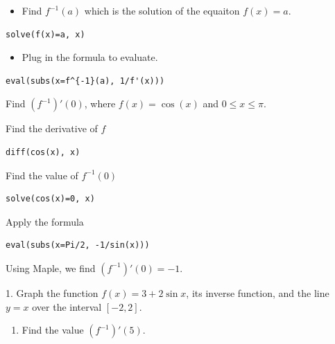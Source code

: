 \documentclass[en,11pt,simple]{elegantbook}
\let\BeginKnitrBlock\begin \let\EndKnitrBlock\end
\begin{document}
\begin{itemize}

\item
  Find \(f^{-1}(a)\) which is the solution of the equaiton \(f(x)=a\).
\end{itemize}

\begin{verbatim}
solve(f(x)=a, x)
\end{verbatim}

\begin{itemize}

\item
  Plug in the formula to evaluate.
\end{itemize}

\begin{verbatim}
eval(subs(x=f^{-1}(a), 1/f'(x)))
\end{verbatim}

\BeginKnitrBlock{example}{}{}
\protect\hypertarget{exm:unnamed-chunk-166}{}{\label{exm:unnamed-chunk-166} }
Find \((f^{-1})'(0)\), where \(f(x)=\cos(x)\) and \(0\leq x\leq \pi\).
\EndKnitrBlock{example}

\BeginKnitrBlock{solution}{}{}
{}
Find the derivative of \(f\)

\begin{verbatim}
diff(cos(x), x)
\end{verbatim}

Find the value of \(f^{-1}(0)\)

\begin{verbatim}
solve(cos(x)=0, x)
\end{verbatim}

Apply the formula

\begin{verbatim}
eval(subs(x=Pi/2, -1/sin(x)))
\end{verbatim}

Using Maple, we find \((f^{-1})'(0)=-1\).
\EndKnitrBlock{solution}

\BeginKnitrBlock{exercise}{}{}
\protect\hypertarget{exr:unnamed-chunk-168}{}{\label{exr:unnamed-chunk-168} }
1. Graph the function \(f(x)=3+2\sin x\), its inverse function, and the line \(y=x\) over the interval \([-2,2]\).

\begin{enumerate}
\def\labelenumi{\arabic{enumi}.}
\setcounter{enumi}{1}

\item
  Find the value \((f^{-1})'(5)\).
\end{enumerate}
\EndKnitrBlock{exercise}
\end{document}
